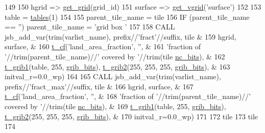 \begin{DoxyCode}
149 
150     hgrid   => \hyperlink{namespacemo__jsb__grid_ad009e7ddbafe2ef26506e2a5abdeb4db}{get\_grid}(grid\_id)
151     surface => \hyperlink{namespacemo__jsb__grid_a2111791e291579cc1551a4213a670e35}{get\_vgrid}(\textcolor{stringliteral}{'surface'})
152 
153     table = \hyperlink{namespacemo__jsb__io_aefd9f08b763f8c7b6f4cdbc576e3dd14}{tables}(1)
154 
155     parent\_tile\_name = tile%
156     \textcolor{keywordflow}{IF} (parent\_tile\_name == \textcolor{stringliteral}{''}) parent\_tile\_name = \textcolor{stringliteral}{'grid box  '}
157 
158     \textcolor{keyword}{CALL }jsb\_add\_var(trim(varlist\_name), prefix//\textcolor{stringliteral}{'fract'}//suffix, tile%
         &
159       hgrid, surface,                                                                                      
         &
160       \hyperlink{structmo__jsb__io_1_1t__cf}{t\_cf}(\textcolor{stringliteral}{'land\_area\_fraction'}, \textcolor{stringliteral}{''},                                                                   
             &
161                \textcolor{stringliteral}{'fraction of '}//trim(parent\_tile\_name)//\textcolor{stringliteral}{' covered by '}//trim(tile%
      \hyperlink{namespacemo__jsb__io_a4bf2b656fa0a7acf938f0bfcad5870e3}{nc\_bits}),             &
162       \hyperlink{structmo__jsb__io_1_1t__grib1}{t\_grib1}(table, 255, \hyperlink{namespacemo__jsb__io_aade09fd070010f905e77497f041ce6c3}{grib\_bits}), \hyperlink{structmo__jsb__io_1_1t__grib2}{t\_grib2}(255, 255, 255, 
      \hyperlink{namespacemo__jsb__io_aade09fd070010f905e77497f041ce6c3}{grib\_bits}),                                      &
163       initval\_r=0.0\_wp)
164 
165     \textcolor{keyword}{CALL }jsb\_add\_var(trim(varlist\_name), prefix//\textcolor{stringliteral}{'fract\_max'}//suffix, tile%
         &
166       hgrid, surface,                                                                                      
         &
167       \hyperlink{structmo__jsb__io_1_1t__cf}{t\_cf}(\textcolor{stringliteral}{'land\_area\_fraction'}, \textcolor{stringliteral}{''},                                                                   
             &
168                \textcolor{stringliteral}{'fraction of '}//trim(parent\_tile\_name)//\textcolor{stringliteral}{' covered by '}//trim(tile%
      \hyperlink{namespacemo__jsb__io_a4bf2b656fa0a7acf938f0bfcad5870e3}{nc\_bits}),             &
169       \hyperlink{structmo__jsb__io_1_1t__grib1}{t\_grib1}(table, 255, \hyperlink{namespacemo__jsb__io_aade09fd070010f905e77497f041ce6c3}{grib\_bits}), \hyperlink{structmo__jsb__io_1_1t__grib2}{t\_grib2}(255, 255, 255, 
      \hyperlink{namespacemo__jsb__io_aade09fd070010f905e77497f041ce6c3}{grib\_bits}),                                      &
170       initval\_r=0.0\_wp)
171 
172     tile%
173     tile%
174 
\end{DoxyCode}


